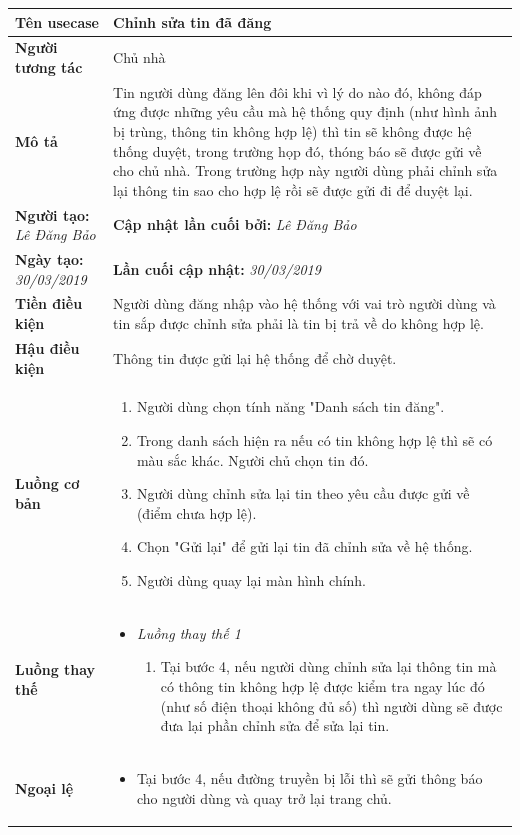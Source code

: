 \begin{center}
	\begin{longtable}{ | l |p{10cm}|}
		\hline
		\textbf{Tên usecase} & Chỉnh sửa tin đã đăng \\ \hline
		\textbf{Người tương tác} & Chủ nhà \\ \hline   
		\textbf{Mô tả} &  Tin người dùng đăng lên đôi khi vì lý do nào đó, không đáp ứng được những yêu cầu mà hệ thống quy định (như hình ảnh bị trùng, thông tin không hợp lệ) thì tin sẽ không được hệ thống duyệt, trong trường họp đó, thóng báo sẽ được gửi về cho chủ nhà. Trong trường hợp này người dùng phải chỉnh sửa lại thông tin sao cho hợp lệ rồi sẽ được gửi đi để duyệt lại.\\ \hline  
		\textbf{Người tạo:} \textit{Lê Đăng Bảo} & \textbf{Cập nhật lần cuối bởi:} \textit{Lê Đăng Bảo} \\ \hline
		\textbf{Ngày tạo:} \textit{30/03/2019} & \textbf{Lần cuối cập nhật:} \textit{30/03/2019} \\ \hline
		\textbf{Tiền điều kiện} &  Người dùng đăng nhập vào hệ thống với vai trò người dùng và tin sắp được chỉnh sửa phải là tin bị trả về do không hợp lệ. \\ \hline 
		\textbf{Hậu điều kiện} &  Thông tin được gửi lại hệ thống để chờ duyệt. \\ \hline 
		\textbf{Luồng cơ bản} & 
		\begin{enumerate}
			\item Người dùng chọn tính năng "Danh sách tin đăng".
			\item Trong danh sách hiện ra nếu có tin không hợp lệ thì sẽ có màu sắc khác. Người chủ chọn tin đó.
			\item Người dùng chỉnh sửa lại tin theo yêu cầu được gửi về (điểm chưa hợp lệ).
			\item Chọn "Gửi lại" để gửi lại tin đã chỉnh sửa về hệ thống.
			\item Người dùng quay lại màn hình chính.
			
		\end{enumerate} \\ \hline 
		\textbf{Luồng thay thế} & 
		\begin{itemize} 
			\item \textit{Luồng thay thế 1}
			\begin{enumerate}
				\item Tại bước 4, nếu người dùng chỉnh sửa lại thông tin mà có thông tin không hợp lệ được kiểm tra ngay lúc đó (như số điện thoại không đủ số) thì người dùng sẽ được đưa lại phần chỉnh sửa để sửa lại tin.
			\end{enumerate}
		\end{itemize} \\ \hline 
		\textbf{Ngoại lệ}  & 
		\begin{itemize}
		    \item Tại bước 4, nếu đường truyền bị lỗi thì sẽ gửi thông báo cho người dùng và quay trở lại trang chủ.
		\end{itemize} \\ \hline
	\end{longtable}
\end{center}


